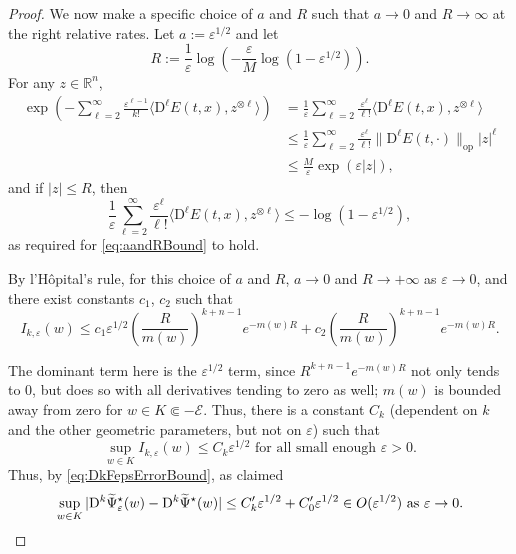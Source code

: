 \documentclass[reqno]{amsart}
\theoremstyle{definition}
\begin{document}
\begin{proof}
	We now make a specific choice of $a$ and $R$ such that $a \to 0$ and $R \to \infty$ at the right relative rates.  Let $a := {\varepsilon}^{1/2}$ and let
	\[
		R := \frac{1}{\varepsilon} \log \left( - \frac{\varepsilon}{M} \log ( 1 - {\varepsilon}^{1/2} ) \right).
	\]
	For any $z \in {\mathbb{R}}^{n}$,
	\begin{align*}
		\exp \left( - \sum_{\ell = 2}^{\infty} \frac{{\varepsilon}^{\ell - 1}}{k !} \langle {\mathrm{D}}^{\ell} E(t, x), z^{\otimes \ell} \rangle \right)
		& = 
		\frac{1}{\varepsilon} \sum_{\ell = 2}^{\infty} \frac{{\varepsilon}^{\ell}}{\ell !} \big\langle {\mathrm{D}}^{\ell} E(t, x) , z^{\otimes \ell} \big\rangle \\
		& \leq \frac{1}{\varepsilon} \sum_{\ell = 2}^{\infty} \frac{{\varepsilon}^{\ell}}{\ell !} \big\| {\mathrm{D}}^{\ell} E(t, \cdot) \big\|_{\mathrm{op}} | z |^{\ell} \\
		& \leq \frac{M}{\varepsilon} \exp ( {\varepsilon} | z | ),
	\end{align*}
	and if $| z | \leq R$, then
	\[
		\frac{1}{\varepsilon} \sum_{\ell = 2}^{\infty} \frac{{\varepsilon}^{\ell}}{\ell !} \big\langle {\mathrm{D}}^{\ell} E(t, x) , z^{\otimes \ell} \big\rangle \leq - \log ( 1 - {\varepsilon}^{1/2} ),
	\]
  as required for \eqref{eq:aandRBound} to hold.

	By l'H\^{o}pital's rule, for this choice of $a$ and $R$, $a \to 0$ and $R \to + \infty$ as ${\varepsilon} \to 0$, and there exist constants $c_{1}$, $c_{2}$ such that
	\[
		I_{k, {\varepsilon}} (w) \leq c_{1} {\varepsilon}^{1/2} \left( \frac{R}{m(w)} \right)^{k + n - 1} e^{- m(w) R} + c_{2} \left( \frac{R}{m(w)} \right)^{k + n - 1} e^{- m(w) R}.
	\]

	\noindent The dominant term here is the ${\varepsilon}^{1/2}$ term, since $R^{k + n - 1} e^{- m(w) R}$ not only tends to $0$, but does so with all derivatives tending to zero as well;  $m(w)$ is bounded away from zero for $w \in K \Subset - {\mathcal{E}}$.  Thus, there is a constant $C_{k}$ (dependent on $k$ and the other geometric parameters, but not on ${\varepsilon}$) such that
	\[
	\sup_{w \in K} I_{k, {\varepsilon}} (w) \leq C_{k} {\varepsilon}^{1/2} \text{ for all small enough } {\varepsilon} > 0.
	\]
	Thus, by \eqref{eq:DkFepsErrorBound}, as claimed
	\[
		\sup_{w \in K} | {\mathrm{D}}^{k} {\widetilde{\Psi}}_{\varepsilon}^{\star} (w) - {\mathrm{D}}^{k} {\widetilde{\Psi}}^{\star} (w) | \leq C'_{k} {\varepsilon}^{1/2} + C'_{0} {\varepsilon}^{1/2} \in O({\varepsilon}^{1/2}) \text{ as } {\varepsilon} \to 0. \qedhere
	\]
\end{proof}
\end{document}
